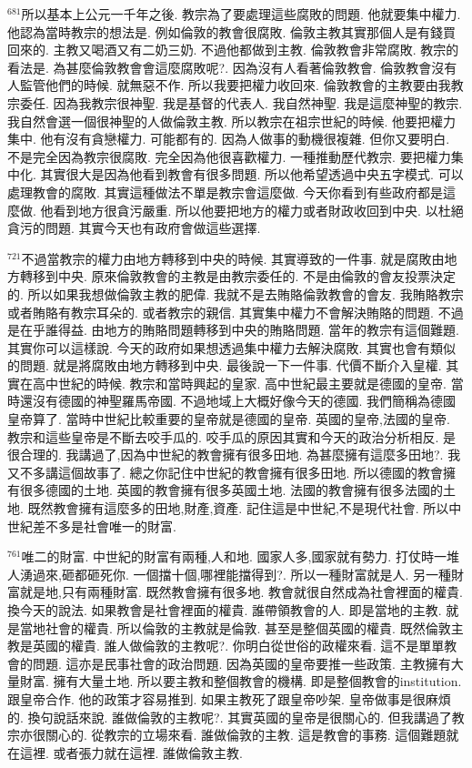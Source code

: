\documentclass{book}
\begin{document}
$^{681}$所以基本上公元一千年之後.
教宗為了要處理這些腐敗的問題.
他就要集中權力.
他認為當時教宗的想法是.
例如倫敦的教會很腐敗.
倫敦主教其實那個人是有錢買回來的.
主教又喝酒又有二奶三奶.
不過他都做到主教.
倫敦教會非常腐敗.
教宗的看法是.
為甚麼倫敦教會會這麼腐敗呢?.
因為沒有人看著倫敦教會.
倫敦教會沒有人監管他們的時候.
就無惡不作.
所以我要把權力收回來.
倫敦教會的主教要由我教宗委任.
因為我教宗很神聖.
我是基督的代表人.
我自然神聖.
我是這麼神聖的教宗.
我自然會選一個很神聖的人做倫敦主教.
所以教宗在祖宗世紀的時候.
他要把權力集中.
他有沒有貪戀權力.
可能都有的.
因為人做事的動機很複雜.
但你又要明白.
不是完全因為教宗很腐敗.
完全因為他很喜歡權力.
一種推動歷代教宗.
要把權力集中化.
其實很大是因為他看到教會有很多問題.
所以他希望透過中央五字模式.
可以處理教會的腐敗.
其實這種做法不單是教宗會這麼做.
今天你看到有些政府都是這麼做.
他看到地方很貪污嚴重.
所以他要把地方的權力或者財政收回到中央.
以杜絕貪污的問題.
其實今天也有政府會做這些選擇.

$^{721}$不過當教宗的權力由地方轉移到中央的時候.
其實導致的一件事.
就是腐敗由地方轉移到中央.
原來倫敦教會的主教是由教宗委任的.
不是由倫敦的會友投票決定的.
所以如果我想做倫敦主教的肥偉.
我就不是去賄賂倫敦教會的會友.
我賄賂教宗或者賄賂有教宗耳朵的.
或者教宗的親信.
其實集中權力不會解決賄賂的問題.
不過是在乎誰得益.
由地方的賄賂問題轉移到中央的賄賂問題.
當年的教宗有這個難題.
其實你可以這樣說.
今天的政府如果想透過集中權力去解決腐敗.
其實也會有類似的問題.
就是將腐敗由地方轉移到中央.
最後說一下一件事.
代價不斷介入皇權.
其實在高中世紀的時候.
教宗和當時興起的皇家.
高中世紀最主要就是德國的皇帝.
當時還沒有德國的神聖羅馬帝國.
不過地域上大概好像今天的德國.
我們簡稱為德國皇帝算了.
當時中世紀比較重要的皇帝就是德國的皇帝.
英國的皇帝,法國的皇帝.
教宗和這些皇帝是不斷去咬手瓜的.
咬手瓜的原因其實和今天的政治分析相反.
是很合理的.
我講過了,因為中世紀的教會擁有很多田地.
為甚麼擁有這麼多田地?.
我又不多講這個故事了.
總之你記住中世紀的教會擁有很多田地.
所以德國的教會擁有很多德國的土地.
英國的教會擁有很多英國土地.
法國的教會擁有很多法國的土地.
既然教會擁有這麼多的田地,財產,資產.
記住這是中世紀,不是現代社會.
所以中世紀差不多是社會唯一的財富.

$^{761}$唯二的財富.
中世紀的財富有兩種,人和地.
國家人多,國家就有勢力.
打仗時一堆人湧過來,砸都砸死你.
一個擋十個,哪裡能擋得到?.
所以一種財富就是人.
另一種財富就是地,只有兩種財富.
既然教會擁有很多地.
教會就很自然成為社會裡面的權貴.
換今天的說法.
如果教會是社會裡面的權貴.
誰帶領教會的人.
即是當地的主教.
就是當地社會的權貴.
所以倫敦的主教就是倫敦.
甚至是整個英國的權貴.
既然倫敦主教是英國的權貴.
誰人做倫敦的主教呢?.
你明白從世俗的政權來看.
這不是單單教會的問題.
這亦是民事社會的政治問題.
因為英國的皇帝要推一些政策.
主教擁有大量財富.
擁有大量土地.
所以要主教和整個教會的機構.
即是整個教會的institution.
跟皇帝合作.
他的政策才容易推到.
如果主教死了跟皇帝吵架.
皇帝做事是很麻煩的.
換句說話來說.
誰做倫敦的主教呢?.
其實英國的皇帝是很關心的.
但我講過了教宗亦很關心的.
從教宗的立場來看.
誰做倫敦的主教.
這是教會的事務.
這個難題就在這裡.
或者張力就在這裡.
誰做倫敦主教.
\end{document}
